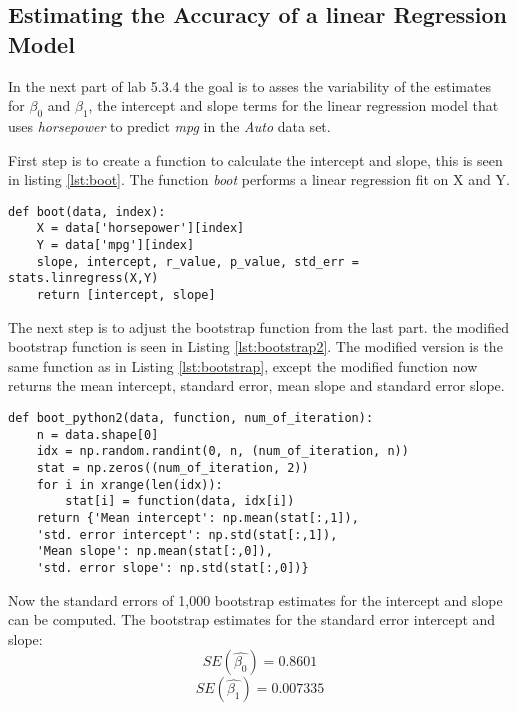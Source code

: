 \subsection{Estimating the Accuracy of a linear Regression Model}

In the next part of lab 5.3.4 the goal is to asses the variability of the estimates for $\beta_0$ and $\beta_1$, the intercept and slope terms for the linear regression model that uses \emph{horsepower} to predict \emph{mpg} in the \emph{Auto} data set.

First step is to create a function to calculate the intercept and slope, this is seen in listing \ref{lst:boot}. The function \emph{boot} performs a linear regression fit on X and Y. 

\begin{lstlisting}[caption={Boot function in python}, label=lst:boot, mathescape=true]
def boot(data, index):
	X = data['horsepower'][index]
	Y = data['mpg'][index]
	slope, intercept, r_value, p_value, std_err = stats.linregress(X,Y)
	return [intercept, slope]
\end{lstlisting}

The next step is to adjust the bootstrap function from the last part. the modified bootstrap function is seen in Listing \ref{lst:bootstrap2}. The modified version is the same function as in Listing \ref{lst:bootstrap}, except the modified function now returns the mean intercept, standard error, mean slope and standard error slope.

\begin{lstlisting}[caption={Modified boot function in python}, label=lst:bootstrap2, mathescape=true]
def boot_python2(data, function, num_of_iteration):
	n = data.shape[0]
	idx = np.random.randint(0, n, (num_of_iteration, n))
	stat = np.zeros((num_of_iteration, 2))
	for i in xrange(len(idx)):
		stat[i] = function(data, idx[i])
	return {'Mean intercept': np.mean(stat[:,1]), 
	'std. error intercept': np.std(stat[:,1]), 
	'Mean slope': np.mean(stat[:,0]), 
	'std. error slope': np.std(stat[:,0])}
\end{lstlisting}

Now the standard errors of 1,000 bootstrap estimates for the intercept and slope can be computed.
The bootstrap estimates for the standard error intercept and slope:
\begin{equation}
SE(\hat{\beta_0}) = 0.8601
\end{equation} 
\begin{equation}
SE(\hat{\beta_1}) = 0.007335
\end{equation}

